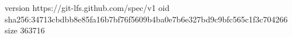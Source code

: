 version https://git-lfs.github.com/spec/v1
oid sha256:34713cbdbb8e85fa16b7bf76f5609b4ba0e7b6e327bd9c9bfc565c1f3c704266
size 363716
